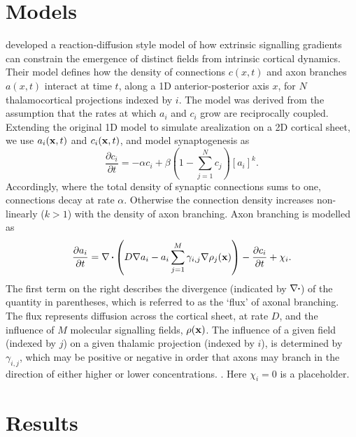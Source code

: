 \documentclass[9pt,lineno]{elife}
\begin{document}
\section{Models}

\cite{karbowski_model_2004} developed a reaction-diffusion style model of how
extrinsic signalling gradients can constrain the emergence of distinct fields
from intrinsic cortical dynamics. Their model defines how the density of
connections $c(x,t)$ and axon branches $a(x,t)$ interact at time $t$, along a
1D anterior-posterior axis $x$, for $N$ thalamocortical projections indexed by
$i$. The model was derived from the assumption that the rates at which $a_i$
and $c_i$ grow are reciprocally coupled. Extending the original 1D model to
simulate arealization on a 2D cortical sheet, we use $a_i(\mathbf{x},t)$ and
$c_i(\mathbf{x},t)$, and model synaptogenesis as
%
\begin{equation} \label{eq:dc}
\frac{\partial c_i}{\partial t} =-\alpha c_i +\beta  \left(1 - \sum_{j=1}^{N} c_{j}\right)[a_i]^k.
\end{equation}
%
Accordingly, where the total density of synaptic connections sums to one,
connections decay at rate $\alpha$. Otherwise the connection density increases
non-linearly ($k>1$) with the density of axon branching. Axon branching is
modelled as
%
\begin{equation} \label{eq:da}
\frac{\partial a_i}{\partial t} = \nabla\vcdot\left(D \nabla a_i-a_i\sum_{j=1}^{M} \gamma_{i,j}\nabla \rho_j(\mb{x})\right) - \frac{\partial c_i}{\partial t} + \chi_i.
\end{equation}
%
The first term on the right describes the divergence (indicated by
$\nabla\vcdot$) of the quantity in parentheses, which is referred to as the
`flux' of axonal branching. The flux represents diffusion across the cortical
sheet, at rate $D$, and the influence of $M$ molecular signalling fields,
$\rho(\mathbf{x})$. The influence of a given field (indexed by $j$) on a given
thalamic projection (indexed by $i$), is determined by $\gamma_{i,j}$, which
may be positive or negative in order that axons may branch in the direction of
either higher or lower concentrations. . Here $\chi_i=0$ is a placeholder.

\section{Results}
\end{document}
